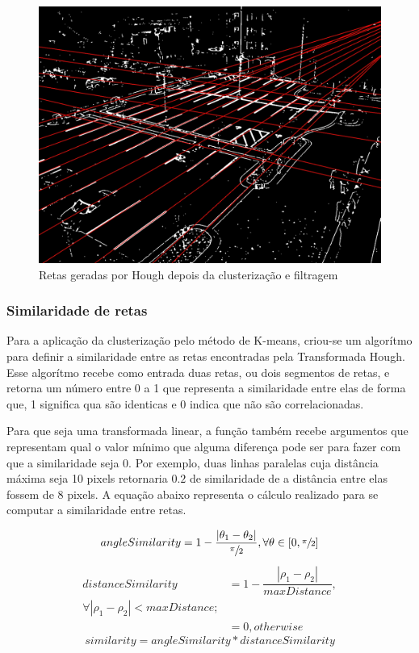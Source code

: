 \documentclass[10pt,twocolumn,letterpaper]{article}
\begin{document}
\begin{figure}[!htb]
\centering
\includegraphics[scale=0.15]{hough-linhas-cluster.jpg}
 \caption{Retas geradas por Hough depois da clusterização e filtragem}
\label{fig:retacluster}
\end{figure}

\subsubsection{Similaridade de retas}

	Para a aplicação da clusterização pelo método de K-means, criou-se um algorítmo
para definir a similaridade entre as retas encontradas pela Transformada Hough. Esse
algorítmo recebe como entrada duas retas, ou dois segmentos de retas, e retorna um
número entre 0 a 1 que representa a similaridade entre elas de forma que, 1 significa
qua são identicas e 0 indica que não são correlacionadas.

	Para que seja uma transformada linear, a função também recebe argumentos que
representam qual o valor mínimo que alguma diferença pode ser para fazer com que a
similaridade seja 0. Por exemplo, duas linhas paralelas cuja distância máxima seja 10 pixels
retornaria $0.2$ de similaridade de a distância entre elas fossem de 8 pixels. A equação abaixo
representa o cálculo realizado para se computar a similaridade entre retas.

\begin{equation*}
angleSimilarity = 1 - \dfrac{|\theta_1 - \theta_2|}{\sfrac{\pi}{2}} , \forall \theta \in [0,\sfrac{\pi}{2}]
\end{equation*}
\begin{equation*}
\begin{split}
distanceSimilarity &= 1 - \dfrac{|\rho_1 - \rho_2|}{maxDistance}, \\
\forall |\rho_1 - \rho_2| < maxDistance; \\
&= 0, otherwise
\end{split}
\end{equation*}
\begin{equation}
similarity = angleSimilarity*distanceSimilarity
\end{equation}
\end{document}
